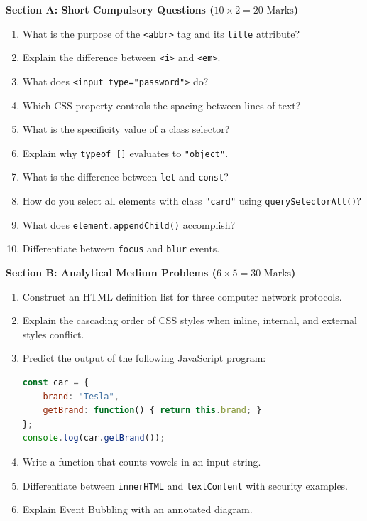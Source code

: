 \begin{mockexam}
\noindent\textbf{Section A: Short Compulsory Questions ($10 \times 2 = 20\text{ Marks}$)}
\begin{enumerate}[leftmargin=1.5em]
    \item What is the purpose of the \texttt{<abbr>} tag and its \texttt{title} attribute?
    \item Explain the difference between \texttt{<i>} and \texttt{<em>}.
    \item What does \texttt{<input type="password">} do?
    \item Which CSS property controls the spacing between lines of text?
    \item What is the specificity value of a class selector?
    \item Explain why \texttt{typeof []} evaluates to \texttt{"object"}.
    \item What is the difference between \texttt{let} and \texttt{const}?
    \item How do you select all elements with class \texttt{"card"} using \texttt{querySelectorAll()}?
    \item What does \texttt{element.appendChild()} accomplish?
    \item Differentiate between \texttt{focus} and \texttt{blur} events.
\end{enumerate}

\medskip
\noindent\textbf{Section B: Analytical Medium Problems ($6 \times 5 = 30\text{ Marks}$)}
\begin{enumerate}[leftmargin=1.5em, start=11]
    \item Construct an HTML definition list for three computer network protocols.
    \item Explain the cascading order of CSS styles when inline, internal, and external styles conflict.
    \item Predict the output of the following JavaScript program:
    \begin{lstlisting}[language=JavaScript]
const car = {
    brand: "Tesla",
    getBrand: function() { return this.brand; }
};
console.log(car.getBrand());
    \end{lstlisting}
    \item Write a function that counts vowels in an input string.
    \item Differentiate between \texttt{innerHTML} and \texttt{textContent} with security examples.
    \item Explain Event Bubbling with an annotated diagram.
\end{enumerate}


\end{mockexam}
